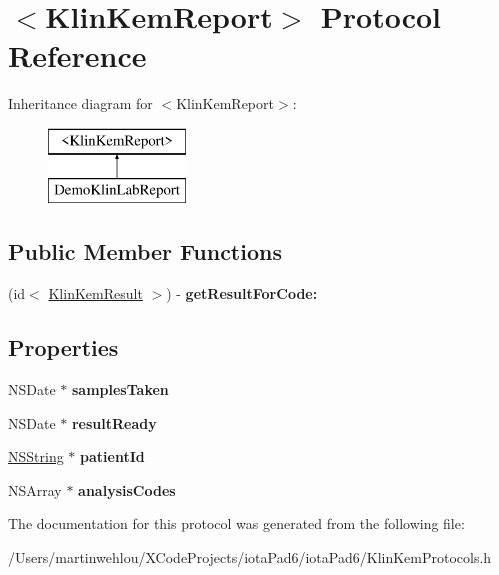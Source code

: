\hypertarget{protocol_klin_kem_report-p}{
\section{$<$KlinKemReport$>$ Protocol Reference}
\label{protocol_klin_kem_report-p}
}
Inheritance diagram for $<$KlinKemReport$>$:\begin{figure}[H]
\begin{center}
\leavevmode
\includegraphics[height=2.000000cm]{protocol_klin_kem_report-p}
\end{center}
\end{figure}
\subsection*{Public Member Functions}
\begin{DoxyCompactItemize}
\item 
\hypertarget{protocol_klin_kem_report-p_a4eb49bcae98c915b9999ec8397f5e2da}{
(id$<$ \hyperlink{protocol_klin_kem_result-p}{KlinKemResult} $>$) -\/ {\bfseries getResultForCode:}}
\label{protocol_klin_kem_report-p_a4eb49bcae98c915b9999ec8397f5e2da}

\end{DoxyCompactItemize}
\subsection*{Properties}
\begin{DoxyCompactItemize}
\item 
\hypertarget{protocol_klin_kem_report-p_a9816bc196adb6b7f12e989c257f9884b}{
NSDate $\ast$ {\bfseries samplesTaken}}
\label{protocol_klin_kem_report-p_a9816bc196adb6b7f12e989c257f9884b}

\item 
\hypertarget{protocol_klin_kem_report-p_a93814c9a0747a47014ad3c8ab8890aaf}{
NSDate $\ast$ {\bfseries resultReady}}
\label{protocol_klin_kem_report-p_a93814c9a0747a47014ad3c8ab8890aaf}

\item 
\hypertarget{protocol_klin_kem_report-p_a8fb638072b07fb9d2d6adec365b9c6e2}{
\hyperlink{class_n_s_string}{NSString} $\ast$ {\bfseries patientId}}
\label{protocol_klin_kem_report-p_a8fb638072b07fb9d2d6adec365b9c6e2}

\item 
\hypertarget{protocol_klin_kem_report-p_a876ebd69b613423847906f8936fb06cf}{
NSArray $\ast$ {\bfseries analysisCodes}}
\label{protocol_klin_kem_report-p_a876ebd69b613423847906f8936fb06cf}

\end{DoxyCompactItemize}


The documentation for this protocol was generated from the following file:\begin{DoxyCompactItemize}
\item 
/Users/martinwehlou/XCodeProjects/iotaPad6/iotaPad6/KlinKemProtocols.h\end{DoxyCompactItemize}
